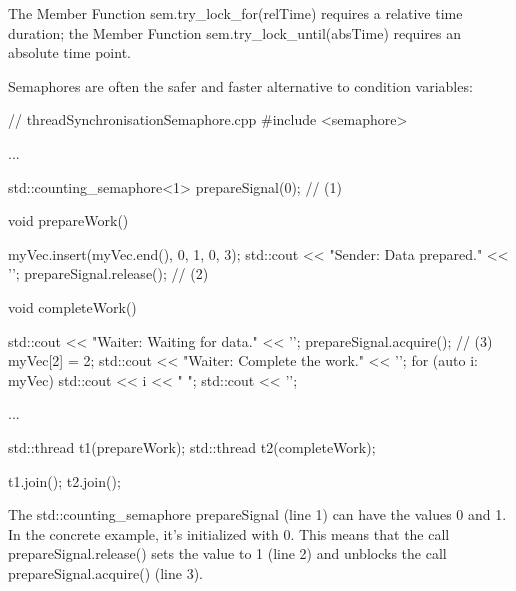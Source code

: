The Member Function sem.try\_lock\_for(relTime) requires a relative time duration; the Member Function sem.try\_lock\_until(absTime) requires an absolute time point.

Semaphores are often the safer and faster alternative to condition variables:


\begin{cpp}
// threadSynchronisationSemaphore.cpp
#include <semaphore>

...

std::counting_semaphore<1> prepareSignal(0); // (1)

void prepareWork() {
	
	myVec.insert(myVec.end(), {0, 1, 0, 3});
	std::cout << "Sender: Data prepared." << '\n';
	prepareSignal.release(); // (2)
}

void completeWork() {
	
	std::cout << "Waiter: Waiting for data." << '\n';
	prepareSignal.acquire(); // (3)
	myVec[2] = 2;
	std::cout << "Waiter: Complete the work." << '\n';
	for (auto i: myVec) std::cout << i << " ";
	std::cout << '\n';
}

...

std::thread t1(prepareWork);
std::thread t2(completeWork);

t1.join();
t2.join();
\end{cpp}

The std::counting\_semaphore prepareSignal (line 1) can have the values 0 and 1. In the concrete example, it’s initialized with 0. This means that the call prepareSignal.release() sets the value to 1 (line 2) and unblocks the call prepareSignal.acquire() (line 3).


































